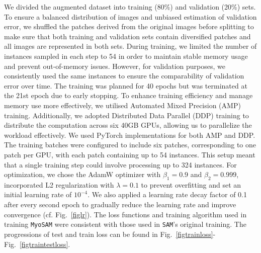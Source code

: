 We divided the augmented dataset into training (80\%) and validation (20\%) sets. To ensure a balanced distribution of images and unbiased estimation of validation error, we shuffled the patches derived from the original images before splitting to make sure that both training and validation sets contain diversified patches and all images are represented in both sets.
During training, we limited the number of instances sampled in each step to 54 in order to maintain stable memory usage and prevent out-of-memory issues. However, for validation purposes, we consistently used the same instances to ensure the comparability of validation error over time. The training was planned for 40 epochs but was terminated at the 21st epoch due to early stopping.
To enhance training efficiency and manage memory use more effectively, we utilised Automated Mixed Precision (AMP) training. Additionally, we adopted Distributed Data Parallel (DDP) training to distribute the computation across six 40GB GPUs, allowing us to parallelize the workload effectively. We used PyTorch \cite{paszke2019pytorch} implementations for both AMP and DDP. The training batches were configured to include six patches, corresponding to one patch per GPU, with each patch containing up to 54 instances. This setup meant that a single training step could involve processing up to 324 instances.
For optimization, we chose the AdamW optimizer with $\beta_1 = 0.9$ and $\beta_2 = 0.999$, incorporated L2 regularization with $\lambda = 0.1$ to prevent overfitting and set an initial learning rate of $10^{-4}$. We also applied a learning rate decay factor of 0.1 after every second epoch to gradually reduce the learning rate and improve convergence (cf. Fig.~\ref{figlr}). The loss functions and training algorithm used in training \texttt{MyoSAM} were consistent with those used in \texttt{SAM}'s original training. The progressions of test and train loss can be found in Fig.~\ref{figtrainloss}-Fig.~\ref{figtraintestloss}.

